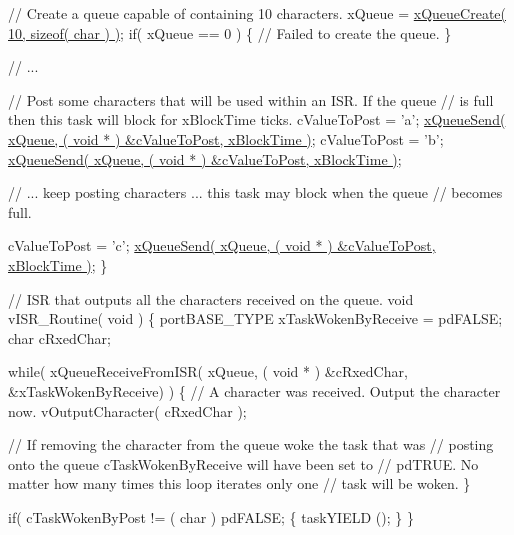 \begin{DoxyPre}   // Create a queue capable of containing 10 characters.
   xQueue = \hyperlink{queue_8h_aeb858b824bd74a934ea7ebb81af2a6bb}{xQueueCreate( 10, sizeof( char ) )};
   if( xQueue == 0 )
   \{
    // Failed to create the queue.
   \}\end{DoxyPre}



\begin{DoxyPre}   // ...\end{DoxyPre}



\begin{DoxyPre}   // Post some characters that will be used within an ISR.  If the queue
   // is full then this task will block for xBlockTime ticks.
   cValueToPost = 'a';
   \hyperlink{queue_8h_af7eb49d3249351176992950d9185abe9}{xQueueSend( xQueue, ( void * ) &cValueToPost, xBlockTime )};
   cValueToPost = 'b';
   \hyperlink{queue_8h_af7eb49d3249351176992950d9185abe9}{xQueueSend( xQueue, ( void * ) &cValueToPost, xBlockTime )};\end{DoxyPre}



\begin{DoxyPre}   // ... keep posting characters ... this task may block when the queue
   // becomes full.\end{DoxyPre}



\begin{DoxyPre}   cValueToPost = 'c';
   \hyperlink{queue_8h_af7eb49d3249351176992950d9185abe9}{xQueueSend( xQueue, ( void * ) &cValueToPost, xBlockTime )};
\}\end{DoxyPre}



\begin{DoxyPre}// ISR that outputs all the characters received on the queue.
void vISR\_Routine( void )
\{
portBASE\_TYPE xTaskWokenByReceive = pdFALSE;
char cRxedChar;\end{DoxyPre}



\begin{DoxyPre}   while( xQueueReceiveFromISR( xQueue, ( void * ) &cRxedChar, &xTaskWokenByReceive) )
   \{
    // A character was received.  Output the character now.
    vOutputCharacter( cRxedChar );\end{DoxyPre}



\begin{DoxyPre}    // If removing the character from the queue woke the task that was
    // posting onto the queue cTaskWokenByReceive will have been set to
    // pdTRUE.  No matter how many times this loop iterates only one
    // task will be woken.
   \}\end{DoxyPre}



\begin{DoxyPre}   if( cTaskWokenByPost != ( char ) pdFALSE;
   \{
    taskYIELD ();
   \}
\}
\end{DoxyPre}
 